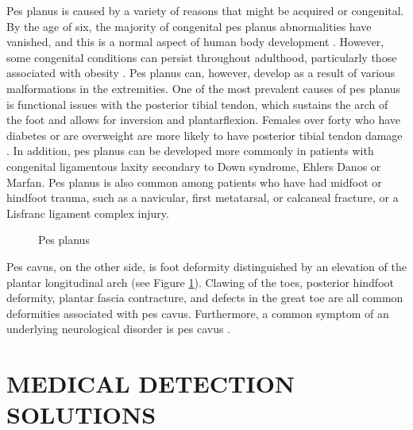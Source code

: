 Pes planus is caused by a variety of reasons that might be acquired or congenital. By the age of six, the majority of congenital pes planus abnormalities have vanished, and this is a normal aspect of human body development \cite{Mickle2006TheFO}. However, some congenital conditions can persist throughout adulthood, particularly those associated with obesity \cite{Woniacka2013BodyWA}. Pes planus can, however, develop as a result of various malformations in the extremities. One of the most prevalent causes of pes planus is functional issues with the posterior tibial tendon, which sustains the arch of the foot and allows for inversion and plantarflexion. Females over forty who have diabetes or are overweight are more likely to have posterior tibial tendon damage \cite{KohlsGatzoulis2009ThePO}. In addition, pes planus can be developed more commonly in patients with congenital ligamentous laxity secondary to Down syndrome, Ehlers Danos or Marfan. Pes planus is also common among patients who have had midfoot or hindfoot trauma, such as a navicular, first metatarsal, or calcaneal fracture, or a Lisfranc ligament complex injury.

\begin{figure}[htbp]
\centering
{}
\caption{Pes planus \cite{physiopediapescavus}}
\label{fig:BackgroundPesCavus}
\end{figure}

Pes cavus,  on the other side, is foot deformity distinguished by an elevation of the plantar longitudinal arch (see Figure \ref{fig:BackgroundPesCavus}). Clawing of the toes, posterior hindfoot deformity, plantar fascia contracture, and defects in the great toe are all common deformities associated with pes cavus. Furthermore, a common symptom of an underlying neurological disorder is pes cavus \cite{Brewerton1963IDIOPATHICPC}.

\section{MEDICAL DETECTION SOLUTIONS}

